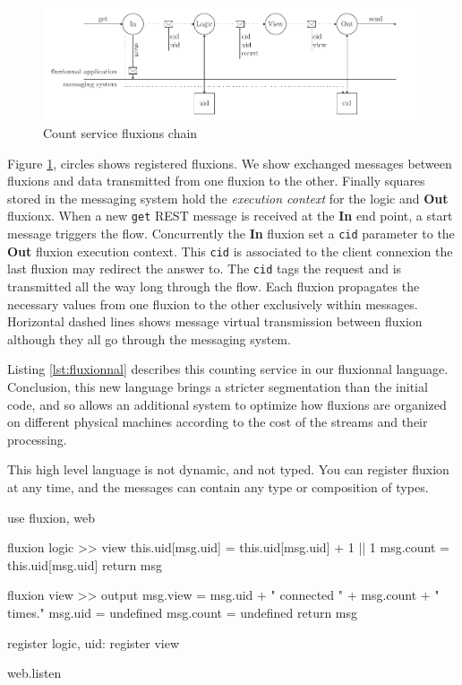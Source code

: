 \begin{figure}[h!]
  \includegraphics[width=\linewidth]{flux.pdf}
  \caption{Count service fluxions chain}
  \label{fig:fluxions}
\end{figure}

Figure \ref{fig:fluxions}, circles shows registered fluxions.
We show exchanged messages between fluxions and data transmitted from one fluxion to the other. Finally squares stored in the messaging system hold the \textit{execution context} for the logic and \textbf{Out} fluxionx.
When a new \texttt{get} REST message is received at the \textbf{In} end point, a start message triggers the flow.
Concurrently the \textbf{In} fluxion set a \texttt{cid} parameter to the \textbf{Out} fluxion execution context.
This \texttt{cid} is associated to the client connexion the last fluxion may redirect the answer to.
The \texttt{cid} tags the request and is transmitted all the way long through the flow.
Each fluxion propagates the necessary values from one fluxion to the other exclusively within messages.
Horizontal dashed lines shows message virtual transmission between fluxion although they all go through the messaging system.

Listing \ref{lst:fluxionnal} describes this counting service in our fluxionnal language.
Conclusion, this new language brings a stricter segmentation than the initial code, and so allows an additional system to optimize how fluxions are organized on different physical machines according to the cost of the streams and their processing. 

This high level language is not dynamic, and not typed.
You can register fluxion at any time, and the messages can contain any type or composition of types.

\begin{code}[Javascript, caption={Fluxionnal sample},label={lst:fluxionnal}]
use fluxion, web

fluxion logic >> view
  this.uid[msg.uid] = this.uid[msg.uid] + 1 || 1
  msg.count = this.uid[msg.uid]
  return msg

fluxion view >> output
  msg.view = msg.uid + " connected " + msg.count + " times."
  msg.uid = undefined
  msg.count = undefined
  return msg

register logic, {uid: {}}
register view

web.listen
\end{code}

